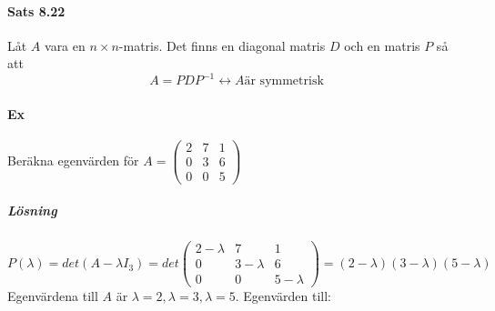 \paragraph{Sats 8.22} Låt $A$ vara en $n\times n $-matris.
Det finns en diagonal matris $D$  och en matris $P$ så att
\begin{equation*}
    A=PDP^{-1}\leftrightarrow A\text{är symmetrisk}
\end{equation*}

\paragraph{Ex} Beräkna egenvärden för $A=\begin{pmatrix}2&7&1\\0&3&6\\0&0&5\end{pmatrix}$
\subparagraph{Lösning} 
\begin{equation*}
    P(\lambda)=det(A-\lambda I_3)=det\begin{pmatrix}
        2-\lambda&7&1\\
        0&3-\lambda&6\\
        0&0&5-\lambda
    \end{pmatrix}
    =(2-\lambda)(3-\lambda)(5-\lambda)
\end{equation*}
Egenvärdena till $A$ är $\lambda=2,\lambda=3,\lambda=5$.
Egenvärden till:

